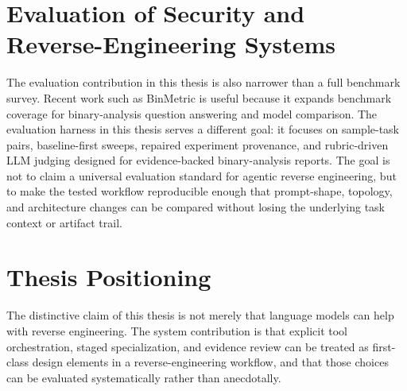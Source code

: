 \section{Evaluation of Security and Reverse-Engineering Systems}

The evaluation contribution in this thesis is also narrower than a full benchmark survey. Recent work such as BinMetric \cite{shang2025binmetriccomprehensivebinaryanalysis} is useful because it expands benchmark coverage for binary-analysis question answering and model comparison. The evaluation harness in this thesis serves a different goal: it focuses on sample-task pairs, baseline-first sweeps, repaired experiment provenance, and rubric-driven LLM judging designed for evidence-backed binary-analysis reports. The goal is not to claim a universal evaluation standard for agentic reverse engineering, but to make the tested workflow reproducible enough that prompt-shape, topology, and architecture changes can be compared without losing the underlying task context or artifact trail.


\section{Thesis Positioning}

The distinctive claim of this thesis is not merely that language models can help with reverse engineering. The system contribution is that explicit tool orchestration, staged specialization, and evidence review can be treated as first-class design elements in a reverse-engineering workflow, and that those choices can be evaluated systematically rather than anecdotally.
